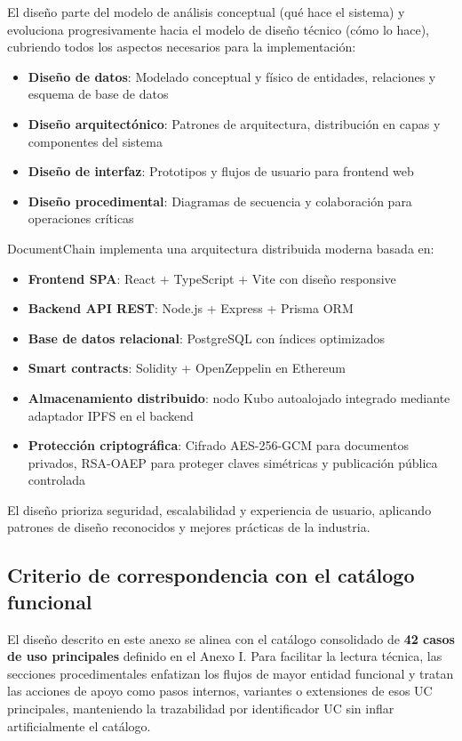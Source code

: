 \documentclass[11pt, a4paper]{article}
\begin{document}
El diseño parte del modelo de análisis conceptual (qué hace el sistema) y evoluciona progresivamente hacia el modelo de diseño técnico (cómo lo hace), cubriendo todos los aspectos necesarios para la implementación:

\begin{itemize}
    \item \textbf{Diseño de datos}: Modelado conceptual y físico de entidades, relaciones y esquema de base de datos
    \item \textbf{Diseño arquitectónico}: Patrones de arquitectura, distribución en capas y componentes del sistema
    \item \textbf{Diseño de interfaz}: Prototipos y flujos de usuario para frontend web
    \item \textbf{Diseño procedimental}: Diagramas de secuencia y colaboración para operaciones críticas
\end{itemize}

DocumentChain implementa una arquitectura distribuida moderna basada en:

\begin{itemize}
    \item \textbf{Frontend SPA}: React + TypeScript + Vite con diseño responsive
    \item \textbf{Backend API REST}: Node.js + Express + Prisma ORM
    \item \textbf{Base de datos relacional}: PostgreSQL con índices optimizados
    \item \textbf{Smart contracts}: Solidity + OpenZeppelin en Ethereum
    \item \textbf{Almacenamiento distribuido}: nodo Kubo autoalojado integrado mediante adaptador IPFS en el backend
    \item \textbf{Protección criptográfica}: Cifrado AES-256-GCM para documentos privados, RSA-OAEP para proteger claves simétricas y publicación pública controlada
\end{itemize}

El diseño prioriza seguridad, escalabilidad y experiencia de usuario, aplicando patrones de diseño reconocidos y mejores prácticas de la industria.

\subsection*{Criterio de correspondencia con el catálogo funcional}

El diseño descrito en este anexo se alinea con el catálogo consolidado de \textbf{42 casos de uso principales} definido en el Anexo I. Para facilitar la lectura técnica, las secciones procedimentales enfatizan los flujos de mayor entidad funcional y tratan las acciones de apoyo como pasos internos, variantes o extensiones de esos UC principales, manteniendo la trazabilidad por identificador UC sin inflar artificialmente el catálogo.
\end{document}
